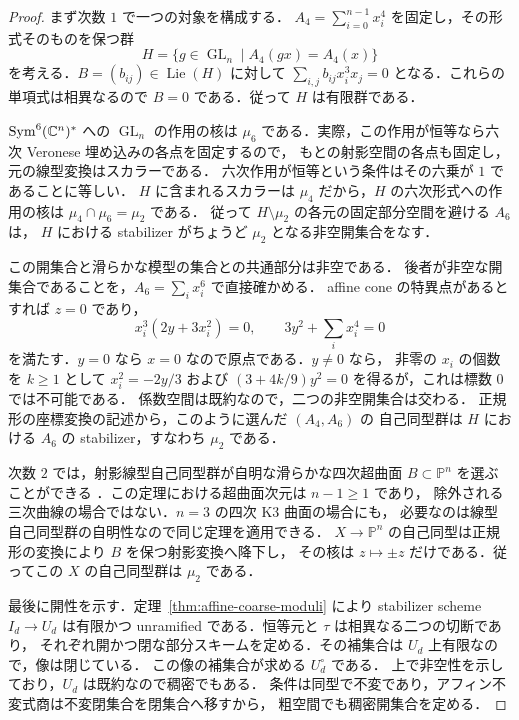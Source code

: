 \begin{proof}
まず次数 $1$ で一つの対象を構成する．
$A_4=\sum_{i=0}^{n-1}x_i^4$ を固定し，その形式そのものを保つ群
\[
 H=\{g\in\operatorname{GL}_n\mid A_4(gx)=A_4(x)\}
\]
を考える．$B=(b_{ij})\in\operatorname{Lie}(H)$ に対して
$\sum_{i,j}b_{ij}x_i^3x_j=0$ となる．これらの単項式は相異なるので
$B=0$ である．従って $H$ は有限群である．

$\operatorname{Sym}^6(\mathbb C^n)^*$ への $\operatorname{GL}_n$ の作用の核は
$\mu_6$ である．実際，この作用が恒等なら六次 Veronese 埋め込みの各点を固定するので，
もとの射影空間の各点も固定し，元の線型変換はスカラーである．
六次作用が恒等という条件はその六乗が $1$ であることに等しい．
$H$ に含まれるスカラーは $\mu_4$ だから，$H$ の六次形式への作用の核は
$\mu_4\cap\mu_6=\mu_2$ である．
従って $H\setminus\mu_2$ の各元の固定部分空間を避ける $A_6$ は，
$H$ における stabilizer がちょうど $\mu_2$ となる非空開集合をなす．

この開集合と滑らかな模型の集合との共通部分は非空である．
後者が非空な開集合であることを，$A_6=\sum_i x_i^6$ で直接確かめる．
affine cone の特異点があるとすれば $z=0$ であり，
\[
 x_i^3(2y+3x_i^2)=0,\qquad 3y^2+\sum_i x_i^4=0
\]
を満たす．$y=0$ なら $x=0$ なので原点である．$y\ne0$ なら，
非零の $x_i$ の個数を $k\geq1$ として
$x_i^2=-2y/3$ および
$(3+4k/9)y^2=0$ を得るが，これは標数 $0$ では不可能である．
係数空間は既約なので，二つの非空開集合は交わる．
正規形の座標変換の記述から，このように選んだ $(A_4,A_6)$ の
自己同型群は $H$ における $A_6$ の stabilizer，すなわち $\mu_2$ である．

次数 $2$ では，射影線型自己同型群が自明な滑らかな四次超曲面
$B\subset\mathbb P^n$ を選ぶことができる
\cite[Theorem~1.6]{Poonen2005}．この定理における超曲面次元は $n-1\geq1$ であり，
除外される三次曲線の場合ではない．$n=3$ の四次 K3 曲面の場合にも，
必要なのは線型自己同型群の自明性なので同じ定理を適用できる．
$X\to\mathbb P^n$ の自己同型は正規形の変換により $B$ を保つ射影変換へ降下し，
その核は $z\mapsto\pm z$ だけである．従ってこの $X$ の自己同型群は $\mu_2$ である．

最後に開性を示す．定理~\ref{thm:affine-coarse-moduli} により stabilizer scheme
$I_d\to U_d$ は有限かつ unramified である．恒等元と $\tau$ は相異なる二つの切断であり，
それぞれ開かつ閉な部分スキームを定める．その補集合は $U_d$ 上有限なので，像は閉じている．
この像の補集合が求める $U_d^{\circ}$ である．
上で非空性を示しており，$U_d$ は既約なので稠密でもある．
条件は同型で不変であり，アフィン不変式商は不変閉集合を閉集合へ移すから，
粗空間でも稠密開集合を定める．
\end{proof}

